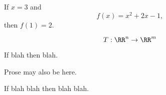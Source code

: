 

If $x=3$ and
$$ f(x) = x^2 + 2x - 1 , $$
then $f(1)=2$.

\begin{equation*}
    T : \RR^n \to \RR^m
\end{equation*}

\begin{theorem}
    If blah then blah.
\end{theorem}

Prose may also be here.

\begin{theorem}
    If blah blah then blah blah.
\end{theorem}

